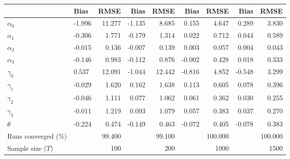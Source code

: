 
\begin{tabular}[t]{llrrrrrrr}
\toprule
  & Bias & RMSE & Bias & RMSE & Bias & RMSE & Bias & RMSE\\
\midrule
$\alpha_{0}$ & -1.996 & 11.277 & -1.135 & 8.685 & 0.155 & 4.647 & 0.289 & 3.830\\
$\alpha_{1}$ & -0.306 & 1.771 & -0.179 & 1.314 & 0.022 & 0.712 & 0.044 & 0.589\\
$\alpha_{2}$ & -0.015 & 0.136 & -0.007 & 0.139 & 0.003 & 0.057 & 0.004 & 0.043\\
$\alpha_{3}$ & -0.146 & 0.983 & -0.112 & 0.876 & -0.002 & 0.428 & 0.018 & 0.333\\
$\gamma_{0}$ & 0.537 & 12.091 & -1.044 & 12.442 & -0.816 & 4.852 & -0.548 & 3.299\\
$\gamma_{1}$ & -0.029 & 1.620 & 0.162 & 1.638 & 0.113 & 0.605 & 0.078 & 0.396\\
$\gamma_{2}$ & -0.046 & 1.111 & 0.077 & 1.062 & 0.061 & 0.362 & 0.030 & 0.255\\
$\gamma_{3}$ & -0.011 & 1.219 & 0.093 & 1.079 & 0.057 & 0.383 & 0.037 & 0.270\\
$\theta$ & -0.224 & 0.474 & -0.149 & 0.463 & -0.072 & 0.405 & -0.078 & 0.383\\
Runs converged (\%) &  & 99.400 &  & 99.100 &  & 100.000 &  & 100.000\\
Sample size ($T$) &  & 100 &  & 200 &  & 1000 &  & 1500\\
\bottomrule
\end{tabular}

